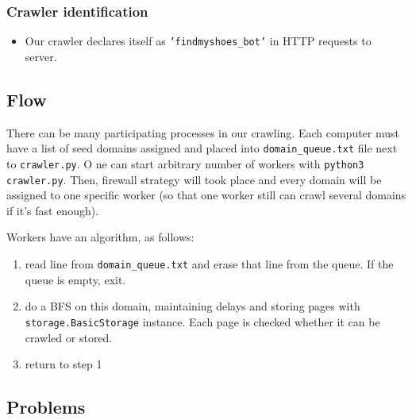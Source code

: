 \documentclass[format=sigconf]{acmart}
\begin{document}
\subsubsection{Crawler identification}
\begin{itemize}
    \item Our crawler declares itself as \texttt{'findmyshoes\_bot'} in HTTP requests to server.
\end{itemize}

\subsection{Flow}
    There can be many participating processes in our crawling. 
    Each computer must have a list of seed domains assigned and placed into \texttt{domain\_queue.txt} file next to \texttt{crawler.py}. O
    ne can start arbitrary number of workers with \texttt{python3 crawler.py}. Then, firewall strategy will took place and every domain will be assigned to one specific worker (so that one worker still can crawl several domains if it's fast enough).
    
    Workers have an algorithm, as follows:
    \begin{enumerate}
        \item read line from \texttt{domain\_queue.txt} and erase that line from the queue. If the queue is empty, exit.
        \item do a BFS on this domain, maintaining delays and storing pages with \texttt{storage.BasicStorage} instance. Each page is checked whether it can be crawled or stored.
        \item return to step 1
    \end{enumerate}

\subsection{Problems}
\end{document}

